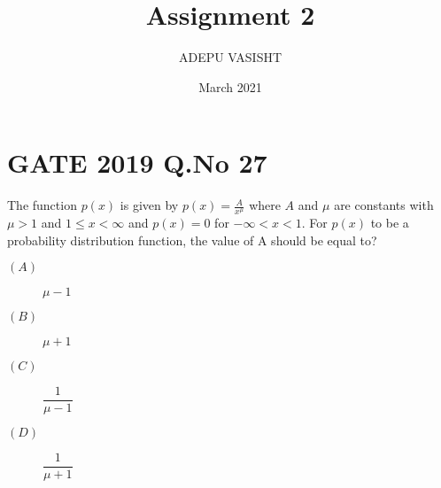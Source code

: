 \documentclass[journal,12pt,twocolumn]{IEEEtran}
\title{Assignment 2}
\author{ADEPU VASISHT}
\date{March 2021}
\providecommand{\brak}[1]{\ensuremath{\left(#1\right)}}
\begin{document}
\maketitle

\section*{GATE 2019 Q.No 27}
The function $p\brak{x}$ is given by $p\brak{x} = \frac{A}{x^\mu}$ where $A$ and $\mu$ are constants with $\mu>1$ and $1\leq x<\infty$ and $p\brak{x}= 0$ for $-\infty<x<1$. For $p\brak{x}$ to be a probability distribution function, the value of A should be equal to?

\begin{description}
\item[$\brak{A}$]$\mu -1$\\
\item[$\brak{B}$]$\mu+1$\\
\item[$\brak{C}$]$\dfrac{1}{\mu-1}$\\
\item[$\brak{D}$]$\dfrac{1}{\mu+1}$\\
\end{description}
\end{document}
